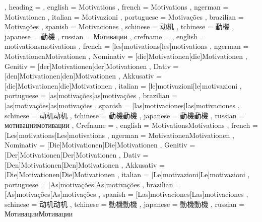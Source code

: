   {
    , heading =   {
                    , english     = Motivations
                    , french      = Motivations
                    , ngerman     = Motivationen
                    , italian     = Motivazioni
                    , portuguese  = Motivações
                    , brazilian   = Motivações
                    , spanish     = Motivaciones
                    , schinese    = 动机
                    , tchinese    = 動機
                    , japanese    = 動機
                    , russian     = Мотивации
                  }
    , crefname =  {
                    , english     = {motivations}{motivations}
                    , french      = [les]{motivations}[les]{motivations}
                    , ngerman     = { {Motivationen}{Motivationen}
                                      , Nominativ = [die]{Motivationen}[die]{Motivationen}
                                      , Genitiv   = [der]{Motivationen}[der]{Motivationen}
                                      , Dativ     = [den]{Motivationen}[den]{Motivationen}
                                      , Akkusativ = [die]{Motivationen}[die]{Motivationen}
                                    }
                    , italian     = [le]{motivazioni}[le]{motivazioni}
                    , portuguese  = [as]{motivações}[as]{motivações}
                    , brazilian   = [as]{motivações}[as]{motivações}
                    , spanish     = [las]{motivaciones}[las]{motivaciones}
                    , schinese    = {动机}{动机}
                    , tchinese    = {動機}{動機}
                    , japanese    = {動機}{動機}
                    , russian     = {мотивации}{мотивации}
                  }
    , Crefname =  {
                    , english     = {Motivations}{Motivations}
                    , french      = [Les]{motivations}[Les]{motivations}
                    , ngerman     = { {Motivationen}{Motivationen}
                                      , Nominativ = [Die]{Motivationen}[Die]{Motivationen}
                                      , Genitiv   = [Der]{Motivationen}[Der]{Motivationen}
                                      , Dativ     = [Den]{Motivationen}[Den]{Motivationen}
                                      , Akkusativ = [Die]{Motivationen}[Die]{Motivationen}
                                    }
                    , italian     = [Le]{motivazioni}[Le]{motivazioni}
                    , portuguese  = [As]{motivações}[As]{motivações}
                    , brazilian   = [As]{motivações}[As]{motivações}
                    , spanish     = [Las]{motivaciones}[Las]{motivaciones}
                    , schinese    = {动机}{动机}
                    , tchinese    = {動機}{動機}
                    , japanese    = {動機}{動機}
                    , russian     = {Мотивации}{Мотивации}
                  }
  }

